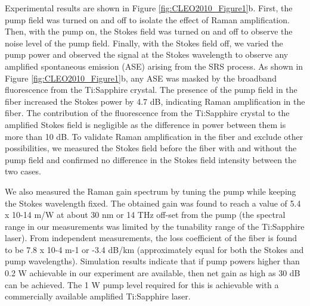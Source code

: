 Experimental results are shown in Figure \ref{fig:CLEO2010_Figure1}b. First, the pump field was turned on and off to isolate the effect of Raman amplification. Then, with the pump on, the Stokes field was turned on and off to observe the noise level of the pump field. Finally, with the Stokes field off, we varied the pump power and observed the signal at the Stokes wavelength to observe any amplified spontaneous emission (ASE) arising from the SRS process. As shown in Figure \ref{fig:CLEO2010_Figure1}b, any ASE was masked by the broadband fluorescence from the Ti:Sapphire crystal. The presence of the pump field in the fiber increased the Stokes power by 4.7 dB, indicating Raman amplification in the fiber. The contribution of the fluorescence from the Ti:Sapphire crystal to the amplified Stokes field is negligible as the difference in power between them is more than 10 dB. To validate Raman amplification in the fiber and exclude other possibilities, we measured the Stokes field before the fiber with and without the pump field and confirmed no difference in the Stokes field intensity between the two cases. 

We also measured the Raman gain spectrum by tuning the pump while keeping the Stokes wavelength fixed. The obtained gain was found to reach a value of 5.4 x 10-14 m/W at about 30 nm or 14 THz off-set from the pump (the spectral range in our measurements was limited by the tunability range of the Ti:Sapphire laser). From independent measurements, the loss coefficient of the fiber is found to be 7.8 x 10-4 m-1 or -3.4 dB/km (approximately equal for both the Stokes and pump wavelengths). Simulation results indicate that if pump powers higher than 0.2 W achievable in our experiment are available, then net gain as high as 30 dB can be achieved. The 1 W pump level required for this is achievable with a commercially available amplified Ti:Sapphire laser. 
